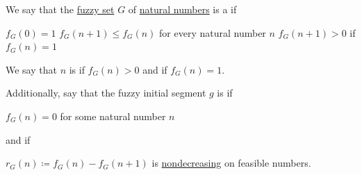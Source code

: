 \begin{definition}\label{def:fuzzy_initial_segment}
  We say that the \hyperref[def:fuzzy_set]{fuzzy set} \( G \) of \hyperref[def:natural_numbers]{natural numbers} is a  if
  \begin{thmenum}[series=def:fuzzy_initial_segment]
     \( f_G(0) = 1 \)
     \( f_G(n + 1) \leq f_G(n) \) for every natural number \( n \)
     \( f_G(n + 1) > 0 \) if \( f_G(n) = 1 \)
  \end{thmenum}

  We say that \( n \) is  if \( f_G(n) > 0 \) and  if \( f_G(n) = 1 \).

  Additionally, say that the fuzzy initial segment \( g \) is  if
  \begin{thmenum}[resume=def:fuzzy_initial_segment]
     \( f_G(n) = 0 \) for some natural number \( n \)
  \end{thmenum}
  and  if
  \begin{thmenum}[resume=def:fuzzy_initial_segment]
     \( r_G(n) \coloneqq f_G(n) - f_G(n + 1) \) is \hyperref[def:order_function/preserving]{nondecreasing} on feasible numbers.
  \end{thmenum}
\end{definition}


